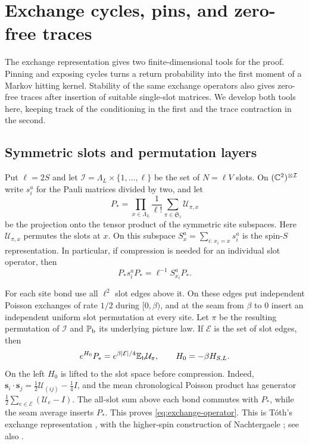 \section{Exchange cycles, pins, and zero-free traces}\label{sec:exchange}

The exchange representation gives two finite-dimensional tools for the
proof.  Pinning and exposing cycles turns a return probability into the
first moment of a Markov hitting kernel.  Stability of the same exchange
operators also gives zero-free traces after insertion of suitable
single-slot matrices.  We develop both tools here, keeping track of the
conditioning in the first and the trace contraction in the second.

\subsection{Symmetric slots and permutation layers}

Put $\ell=2S$ and let
$\mathcal I=\Lambda_L\times\{1,\ldots,\ell\}$ be the set of
$N=\ell V$ slots.  On $(\mathbb C^2)^{\otimes\mathcal I}$ write
$s_i^a$ for the Pauli matrices divided by two, and let
\[
 P_* =\prod_{x\in\Lambda_L}\frac1{\ell!}
                  \sum_{\pi\in\mathfrak S_\ell}\mathcal U_{\pi,x}
\]
be the projection onto the tensor product of the symmetric site
subspaces.  Here $\mathcal U_{\pi,x}$ permutes the slots at $x$.
On this subspace $S_x^a=\sum_{i:\,x_i=x}s_i^a$ is the spin-$S$
representation.  In particular, if compression is needed for an individual
slot operator, then
\begin{equation}\label{eq:compressed-slot}
        P_*s_i^aP_* = \ell^{-1}S_{x_i}^aP_*.
\end{equation}

For each site bond use all $\ell^2$ slot edges above it.  On these
edges put independent Poisson exchanges of rate $1/2$ during
$[0,\beta)$, and at the seam from $\beta$ to $0$ insert an independent
uniform slot permutation at every site.  Let $\pi$ be the resulting
permutation of $\mathcal I$ and $\mathbb P_{\rm b}$ its underlying
picture law.  If $\mathcal E$ is the set of slot edges, then
\begin{equation}\label{eq:exchange-operator}
 e^{H_0}P_*=e^{\beta|\mathcal E|/4}
                    \mathbb E_{\rm b}\mathcal U_\pi,
 \qquad H_0=-\beta H_{S,L}.
\end{equation}
On the left $H_0$ is lifted to the slot space before compression.
Indeed,
$\boldsymbol s_i\cdot\boldsymbol s_j=\frac12\mathcal U_{(ij)}-\frac14I$,
and the mean chronological Poisson product has generator
$\frac12\sum_{e\in\mathcal E}(\mathcal U_e-I)$.
The all-slot sum above each bond commutes with $P_*$, while the seam
average inserts $P_*$.  This proves \eqref{eq:exchange-operator}.
This is T\'oth's exchange representation \cite{Toth1993}, with the
higher-spin construction of Nachtergaele
\cite[Section~2.2]{Nachtergaele1994}; see also
\cite[Proposition~2.1]{BL}.

